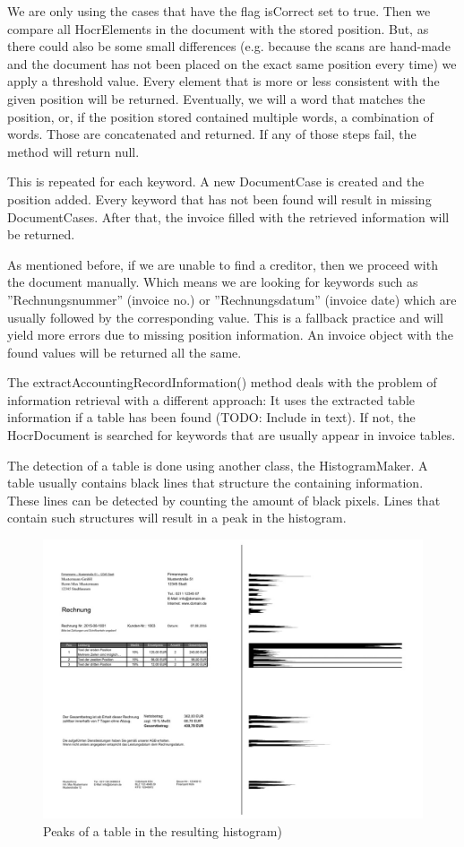 We are only using the cases that have the flag isCorrect set to true. Then we compare all HocrElements in the document with the stored position. But, as there could also be some small differences (e.g. because the scans are hand-made and the document has not been placed on the exact same position every time) we apply a threshold value. Every element that is more or less consistent with the given position will be returned. Eventually, we will a word that matches the position, or, if the position stored contained multiple words, a combination of words. Those are concatenated and returned. If any of those steps fail, the method will return null.

This is repeated for each keyword. A new DocumentCase is created and the position added. Every keyword that has not been found will result in missing DocumentCases. After that, the invoice filled with the retrieved information will be returned.

As mentioned before, if we are unable to find a creditor, then we proceed with the document manually. Which means we are looking for keywords such as ''Rechnungsnummer'' (invoice no.) or ''Rechnungsdatum'' (invoice date) which are usually followed by the corresponding value. This is a fallback practice and will yield more errors due to missing position information. An invoice object with the found values will be returned all the same.

The extractAccountingRecordInformation() method deals with the problem of information retrieval with a different approach: It uses the extracted table information if a table has been found (TODO: Include in text). If not, the HocrDocument is searched for keywords that are usually appear in invoice tables.

The detection of a table is done using another class, the HistogramMaker. A table usually contains black lines that structure the containing information. These lines can be detected by counting the amount of black pixels. Lines that contain such structures will result in a peak in the histogram. 

\begin{figure}[h]
\centering
\includegraphics[scale=0.6]{Images/OCR/histogram.jpg}
\caption{Peaks of a table in the resulting histogram)  \label{histogramImage}}
\end{figure}

